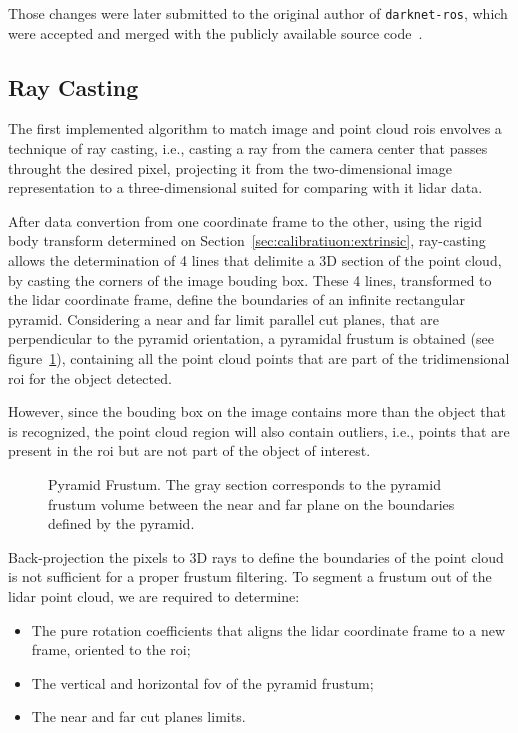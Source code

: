 Those changes were later submitted to the original author of \texttt{darknet-ros}, which were accepted and merged with the publicly available source code~\cite{MarkoBjelonic}.


\subsection{Ray Casting}
The first implemented algorithm to match image and point cloud \acp{roi} envolves a technique of ray casting, i.e., casting a ray from the camera center that passes throught the desired pixel, projecting it from the two-dimensional image representation to a three-dimensional suited for comparing with it \ac{lidar} data.

After data convertion from one coordinate frame to the other, using the rigid body transform determined on Section~\ref{sec:calibratiuon:extrinsic}, ray-casting allows the determination of 4 lines that delimite a 3D section of the point cloud, by casting the corners of the image bouding box. These 4 lines, transformed to the \ac{lidar} coordinate frame, define the boundaries of an infinite rectangular pyramid. Considering a near and far limit parallel cut planes, that are  perpendicular to the pyramid orientation, a pyramidal frustum is obtained (see figure~\ref{fig:pyramid-frustum}), containing all the point cloud points that are part of the tridimensional \ac{roi} for the object detected.  

However, since the bouding box on the image contains more than the object that is recognized, the point cloud region will also contain outliers, i.e., points that are present in the \ac{roi} but are not part of the object of interest.

\begin{figure}[H]
	\centering
	\def\svgwidth{0.3\columnwidth}
	\graphicspath{{img/image-object-to-point-cloud/}}
		
	\caption{Pyramid Frustum. The gray section corresponds to the pyramid frustum volume between the near and far plane on the boundaries defined by the pyramid.}
	\label{fig:pyramid-frustum}
\end{figure}

Back-projection the pixels to 3D rays to define the boundaries of the point cloud is not sufficient for a proper frustum filtering. To segment a frustum out of the \ac{lidar} point cloud, we are required to determine:
\begin{itemize}
	\item The pure rotation coefficients that aligns the \ac{lidar} coordinate frame to a new frame, oriented to the \ac{roi};
	\item The vertical and horizontal \acf{fov} of the pyramid frustum;
	\item The near and far cut planes limits.
\end{itemize}

